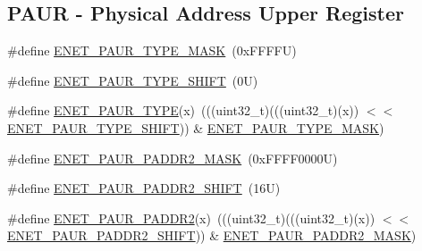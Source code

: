 \subsection*{P\+A\+UR -\/ Physical Address Upper Register}
\begin{DoxyCompactItemize}
\item 
\#define \mbox{\hyperlink{group___e_n_e_t___register___masks_gac3d991850141898124542b0eafdd1419}{E\+N\+E\+T\+\_\+\+P\+A\+U\+R\+\_\+\+T\+Y\+P\+E\+\_\+\+M\+A\+SK}}~(0x\+F\+F\+F\+F\+U)
\item 
\#define \mbox{\hyperlink{group___e_n_e_t___register___masks_ga52173426863fc14a746a5c85d5a3ac12}{E\+N\+E\+T\+\_\+\+P\+A\+U\+R\+\_\+\+T\+Y\+P\+E\+\_\+\+S\+H\+I\+FT}}~(0\+U)
\item 
\#define \mbox{\hyperlink{group___e_n_e_t___register___masks_ga3159a924961395aaf0c16ed5e44f7c34}{E\+N\+E\+T\+\_\+\+P\+A\+U\+R\+\_\+\+T\+Y\+PE}}(x)~(((uint32\+\_\+t)(((uint32\+\_\+t)(x)) $<$$<$ \mbox{\hyperlink{group___e_n_e_t___register___masks_ga52173426863fc14a746a5c85d5a3ac12}{E\+N\+E\+T\+\_\+\+P\+A\+U\+R\+\_\+\+T\+Y\+P\+E\+\_\+\+S\+H\+I\+FT}})) \& \mbox{\hyperlink{group___e_n_e_t___register___masks_gac3d991850141898124542b0eafdd1419}{E\+N\+E\+T\+\_\+\+P\+A\+U\+R\+\_\+\+T\+Y\+P\+E\+\_\+\+M\+A\+SK}})
\item 
\#define \mbox{\hyperlink{group___e_n_e_t___register___masks_ga704d9ce6ebfb6b00ae75c12cd226c30c}{E\+N\+E\+T\+\_\+\+P\+A\+U\+R\+\_\+\+P\+A\+D\+D\+R2\+\_\+\+M\+A\+SK}}~(0x\+F\+F\+F\+F0000\+U)
\item 
\#define \mbox{\hyperlink{group___e_n_e_t___register___masks_ga8a4febd50d867c00d02977b3a4a865dd}{E\+N\+E\+T\+\_\+\+P\+A\+U\+R\+\_\+\+P\+A\+D\+D\+R2\+\_\+\+S\+H\+I\+FT}}~(16\+U)
\item 
\#define \mbox{\hyperlink{group___e_n_e_t___register___masks_ga177d37e2b7ec40d918363854e76f0d51}{E\+N\+E\+T\+\_\+\+P\+A\+U\+R\+\_\+\+P\+A\+D\+D\+R2}}(x)~(((uint32\+\_\+t)(((uint32\+\_\+t)(x)) $<$$<$ \mbox{\hyperlink{group___e_n_e_t___register___masks_ga8a4febd50d867c00d02977b3a4a865dd}{E\+N\+E\+T\+\_\+\+P\+A\+U\+R\+\_\+\+P\+A\+D\+D\+R2\+\_\+\+S\+H\+I\+FT}})) \& \mbox{\hyperlink{group___e_n_e_t___register___masks_ga704d9ce6ebfb6b00ae75c12cd226c30c}{E\+N\+E\+T\+\_\+\+P\+A\+U\+R\+\_\+\+P\+A\+D\+D\+R2\+\_\+\+M\+A\+SK}})
\end{DoxyCompactItemize}
